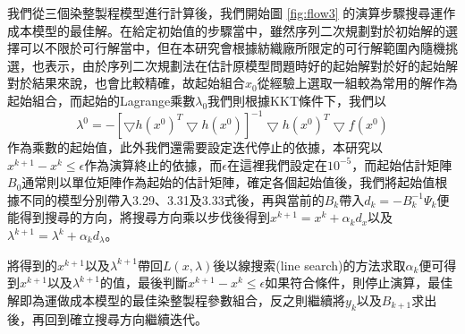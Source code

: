 我們從三個染整製程模型進行計算後，我們開始圖 \ref{fig:flow3} 的演算步驟搜尋運作成本模型的最佳解。在給定初始值的步驟當中，雖然序列二次規劃對於初始解的選擇可以不限於可行解當中，但在本研究會根據紡織廠所限定的可行解範圍內隨機挑選，\cite{Nocedal.etc}也表示，由於序列二次規劃法在估計原模型問題時好的起始解對於好的起始解對於結果來說，也會比較精確，故起始組合$x_{0}$從經驗上選取一組較為常用的解作為起始組合，而起始的Lagrange乘數$\lambda_{0}$我們則根據KKT條件下，我們以
\begin{equation*}
\lambda^{0}=-[\bigtriangledown h(x^{0})^{T}\bigtriangledown h(x^{0})]^{-1}\bigtriangledown h(x^{0})^{T}\bigtriangledown f(x^{0})
\end{equation*}
作為乘數的起始值，此外我們還需要設定迭代停止的依據，本研究以$x^{k+1}-x^{k}\leq \epsilon$作為演算終止的依據，而$\epsilon$在這裡我們設定在$10^{-5}$，而起始估計矩陣$B_{0}$通常則以單位矩陣作為起始的估計矩陣，確定各個起始值後，我們將起始值根據不同的模型分別帶入3.29、3.31及3.33式後，再與當前的$B_{k}$帶入$d_{k}=-B_{k}^{-1}\Psi_{k}$便能得到搜尋的方向，將搜尋方向乘以步伐後得到$x^{k+1}=x^{k}+\alpha_{k}d_{x}$以及$\lambda^{k+1}=\lambda^{k}+\alpha_{k}d_{\lambda}$。

將得到的$x^{k+1}$以及$\lambda^{k+1}$帶回$L(x,\lambda)$後以線搜索(line search)的方法求取$\alpha_{k}$便可得到$x^{k+1}$以及$\lambda^{k+1}$的值，最後判斷$x^{k+1}-x^{k}\leq \epsilon$如果符合條件，則停止演算，最佳解即為運做成本模型的最佳染整製程參數組合，反之則繼續將$y_{k}$以及$B_{k+1}$求出後，再回到確立搜尋方向繼續迭代。